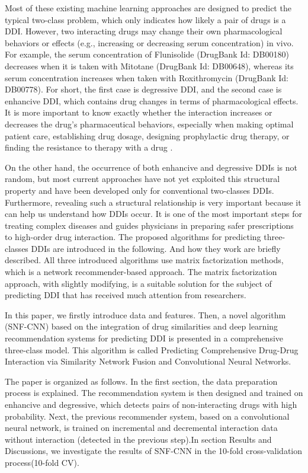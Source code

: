 \documentclass{bmcart}
\begin{document}
Most of these existing machine learning approaches are designed to predict the typical two-class problem, which only indicates how likely a pair of drugs is a DDI. However, two interacting drugs may change their own pharmacological behaviors or effects (e.g., increasing or decreasing serum concentration) in vivo. For example, the serum concentration of Flunisolide (DrugBank Id: DB00180) decreases when it is taken with Mitotane (DrugBank Id: DB00648), whereas its serum concentration increases when taken with Roxithromycin (DrugBank Id: DB00778). For short, the first case is degressive DDI, and the second case is enhancive DDI, which contains drug changes in terms of pharmacological effects. It is more important to know exactly whether the interaction increases or decreases the drug's pharmaceutical behaviors, especially when making optimal patient care, establishing drug dosage, designing prophylactic drug therapy, or finding the resistance to therapy with a drug
\cite{koch1981serum}.

On the other hand, the occurrence of both enhancive and degressive DDIs is not random, but most current approaches have not yet exploited this structural property and have been developed only for conventional two-classes DDIs. Furthermore, revealing such a structural relationship is very important because it can help us understand how DDIs occur. It is one of the most important steps for treating complex diseases and guides physicians in preparing safer prescriptions to high-order drug interaction. The proposed algorithms for predicting three-classes DDIs are introduced in the following. And how they work are briefly described. All three introduced algorithms use matrix factorization methods, which is a network recommender-based approach. The matrix factorization approach, with slightly modifying, is a suitable solution for the subject of predicting DDI that has received much attention from researchers.

In this paper, we firstly introduce data and features. Then, a novel algorithm (SNF-CNN) based on the integration of drug similarities and deep learning recommendation systems for predicting DDI is presented in a comprehensive three-class model. This algorithm is called Predicting Comprehensive Drug-Drug Interaction via Similarity Network Fusion and Convolutional Neural Networks.

The paper is organized as follows. In the first section, the data preparation process is explained. The recommendation system is then designed and trained on enhancive and degressive, which detects pairs of non-interacting drugs with high probability. Next, the previous recommender system, based on a convolutional neural network, is trained on incremental and decremental interaction data without interaction (detected in the previous step).In section Results and Discussions, we investigate the results of SNF-CNN in the 10-fold cross-validation process(10-fold CV).
\end{document}
